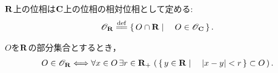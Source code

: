 	\begin{screen}
		\begin{dfn}[$\R$上の位相]
			$\R$上の位相は$\mathbf{C}$上の位相の相対位相として定める:
			\begin{align}
				\mathscr{O}_\R \defeq \Set{O \cap \R}{O \in \mathscr{O}_\C}.
			\end{align}
		\end{dfn}
	\end{screen}
	
	\begin{screen}
		\begin{thm}[$\R$の開集合はボールから成る]
			$O$を$\R$の部分集合とするとき，
			\begin{align}
				O \in \mathscr{O}_{\mathbf{R}} \Longleftrightarrow
				\forall x \in O\, \exists r \in \mathbf{R}_+\, \left(\, \left\{\, y \in \mathbf{R} \mid \quad |x-y| < r\, \right\} \subset O\, \right).
			\end{align}
		\end{thm}
	\end{screen}